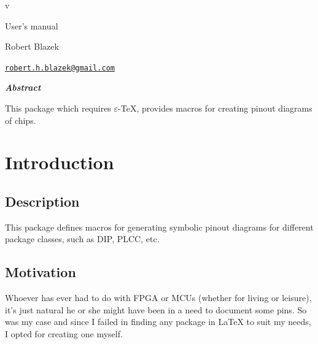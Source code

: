 \documentclass[english,a4paper,10pt]{article}
\begin{document}
\setlength{\parindent}{0pt}
\begin{titlepage}
	\null\par\vfill
	\begin{center}
		\begin{minipage}{0.75\linewidth}
			\begin{center}
				\Huge\bfseries \pinoutikzname\par\vspace{5pt}
				\small v\pinoutikzversion\par\vspace{25pt}
				\normalsize User's manual
			\end{center}
		\end{minipage}
	\end{center}
	\vspace{1cm}
	\begin{center}
		Robert {\sc Blazek}\par\small
		\href{mailto:robert.h.blazek@gmail.com}{\nolinkurl{robert.h.blazek@gmail.com}}\par\vspace{5pt}
	\end{center}
	\vfill\hrulefill
	\begin{center}
		\begin{minipage}{0.85\linewidth}
			\noindent
			\hfill\textbf{\textit{Abstract}}\hfill{}\medskip\par
			This package which requires $\varepsilon$-\TeX{}, provides macros for creating pinout diagrams of chips. 

		\end{minipage}
	\end{center}
	\hrulefill\vfill{}
\end{titlepage}

\tableofcontents

\section{Introduction}
\subsection{Description}
This package defines macros for generating symbolic pinout diagrams for different package classes, such as DIP, PLCC, etc.

\subsection{Motivation}
Whoever has ever had to do with FPGA or MCUs (whether for living or leisure), it's just natural he or she might have been in a need to document some pins. So was my case and since I failed in finding any package in \LaTeX{} to suit my needs, I opted for creating one myself.
\end{document}
